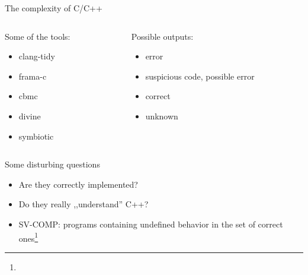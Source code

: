 \documentclass[11pt]{beamer}
\begin{document}
\begin{frame}{The complexity of C/C++}
\begin{columns}

\begin{column}{0.5\textwidth}
Some of the tools:
\begin{itemize}
\pause \item clang-tidy
\pause \item frama-c
\pause \item cbmc
\pause \item divine
\pause \item symbiotic
\end{itemize}
\end{column}

\begin{column}{0.5\textwidth}
\pause
Possible outputs:
\begin{itemize}
\pause \item error
\pause \item suspicious code, possible error
\pause \item correct
\pause \item unknown
\end{itemize}
\end{column}

\end{columns}
\end{frame}


\begin{frame}{Some disturbing questions}

\begin{itemize}
\pause \item Are they correctly implemented?
\pause \item Do they really ,,understand'' C++?
\pause \item SV-COMP: programs containing undefined behavior in the set of correct ones\footnote[frame]{}
\end{itemize}

\end{frame}
\end{document}
